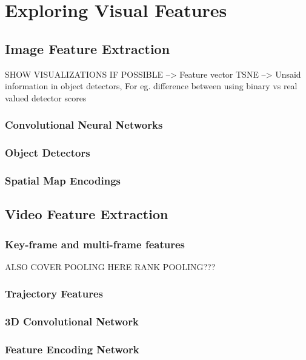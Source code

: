 \chapter{Exploring Visual Features}
\label{chapter:VisFeatChapter}
\section{Image Feature Extraction}
\label{sec:ImageFeat}
SHOW VISUALIZATIONS IF POSSIBLE
    --> Feature vector TSNE
    --> Unsaid information in object detectors, For eg. difference between
    using binary vs real valued detector scores
\subsection{Convolutional Neural Networks}
\subsection{Object Detectors}
\subsection{Spatial Map Encodings}

\section{Video Feature Extraction}
\label{sec:VideoFeat}
\subsection{Key-frame and multi-frame features}
ALSO COVER POOLING HERE
RANK POOLING???
\subsection{Trajectory Features}
\subsection{3D Convolutional Network}
\subsection{Feature Encoding Network}

